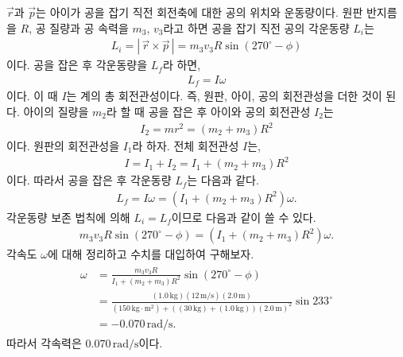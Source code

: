 \documentclass[floatfix,nofootinbib,superscriptaddress,fleqn]{revtex4-2}
\begin{document}
$\vec{r}$과 $\vec{p}$는 아이가 공을 잡기 직전 회전축에 대한 공의 위치와 운동량이다.
원판 반지름을 $R$, 
공 질량과  공 속력을 $m_3$, $v_3$라고 하면 공을 잡기 직전 공의 각운동량 $L_i$는
\begin{align}
  L_i =|\,\vec{r}\times\vec{p}\,|
  = m_3v_3R\sin\left(270^\circ-\phi\right)
\end{align}
이다. 공을 잡은 후 각운동량을 $L_f$라 하면,
\begin{align}
  L_f = I\omega
\end{align}
이다. 이 때 $I$는 계의 총 회전관성이다. 즉, 원판, 아이, 공의 회전관성을 더한 것이 된다.
아이의 질량을 $m_2$라 할 때 
공을 잡은 후 아이와 공의 회전관성 $I_2$는
\begin{align}
  I_2 = mr^2 = (m_2+m_3)R^2
\end{align} 
이다. 원판의 회전관성을 $I_1$라 하자. 전체 회전관성 $I$는,
\begin{align}
  I = I_1 + I_2 = I_1+(m_2+m_3)R^2
\end{align}
이다. 따라서 공을 잡은 후 각운동량 $L_f$는 다음과 같다.
\begin{align}
  L_f = I\omega = (I_1+(m_2+m_3)R^2)\omega.
\end{align}
각운동량 보존 법칙에 의해 $L_i = L_f$이므로 다음과 같이 쓸 수 있다.
\begin{align}
  m_3v_3R\sin\left(270^\circ-\phi\right)
  =(I_1+(m_2+m_3)R^2)\omega.
\end{align} 
각속도 $\omega$에 대해 정리하고 수치를 대입하여 구해보자.
\begin{align}
  \begin{split}
    \omega &= \frac{m_3v_3R}{I_1+(m_2+m_3)R^2}
    \sin\left(270^\circ-\phi\right)  \\
    &= \frac{(1.0\,\mathrm{kg})(12\,\mathrm{m/s})(2.0\,\mathrm{m})}
    {(150\,\mathrm{kg\cdot m^2})
    +((30\,\mathrm{kg})+(1.0\,\mathrm{kg}))(2.0\,\mathrm{m})^2}
    \sin 233^\circ \\
   &=-0.070\,\mathrm{rad/s}.
  \end{split}
\end{align}
따라서 각속력은 $0.070\,\mathrm{rad/s}$이다.
\vspace{1.cm}
\end{document}
